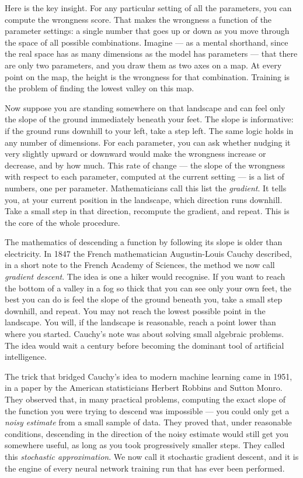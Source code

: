 Here is the key insight. For any particular setting of all the
parameters, you can compute the wrongness score. That makes the
wrongness a function of the parameter settings: a single number
that goes up or down as you move through the space of all possible
combinations. Imagine --- as a mental shorthand, since the real
space has as many dimensions as the model has parameters --- that
there are only two parameters, and you draw them as two axes on a
map. At every point on the map, the height is the wrongness for
that combination. Training is the problem of finding the lowest
valley on this map.

Now suppose you are standing somewhere on that landscape and can
feel only the slope of the ground immediately beneath your feet.
The slope is informative: if the ground runs downhill to your left,
take a step left. The same logic holds in any number of dimensions.
For each parameter, you can ask whether nudging it very slightly
upward or downward would make the wrongness increase or decrease,
and by how much. This rate of change --- the slope of the wrongness
with respect to each parameter, computed at the current setting ---
is a list of numbers, one per parameter. Mathematicians call this
list the \emph{gradient}. It tells you, at your current position in
the landscape, which direction runs downhill. Take a small step in
that direction, recompute the gradient, and repeat. This is the
core of the whole procedure.

The mathematics of descending a function by following its slope
is older than electricity. In 1847 the French mathematician
Augustin-Louis Cauchy described, in a short note to the French
Academy of Sciences, the method we now call \emph{gradient
descent}. The idea is one a hiker would recognise. If you want
to reach the bottom of a valley in a fog so thick that you can
see only your own feet, the best you can do is feel the slope
of the ground beneath you, take a small step downhill, and
repeat. You may not reach the lowest possible point in the
landscape. You will, if the landscape is reasonable, reach a
point lower than where you started. Cauchy's note was about
solving small algebraic problems. The idea would wait a
century before becoming the dominant tool of artificial
intelligence.

The trick that bridged Cauchy's idea to modern machine learning
came in 1951, in a paper by the American statisticians Herbert
Robbins and Sutton Monro. They observed that, in many practical
problems, computing the exact slope of the function you were
trying to descend was impossible --- you could only get a
\emph{noisy estimate} from a small sample of data. They proved
that, under reasonable conditions, descending in the direction
of the noisy estimate would still get you somewhere useful, as
long as you took progressively smaller steps. They called this
\emph{stochastic approximation}. We now call it stochastic
gradient descent, and it is the engine of every neural network
training run that has ever been performed.

